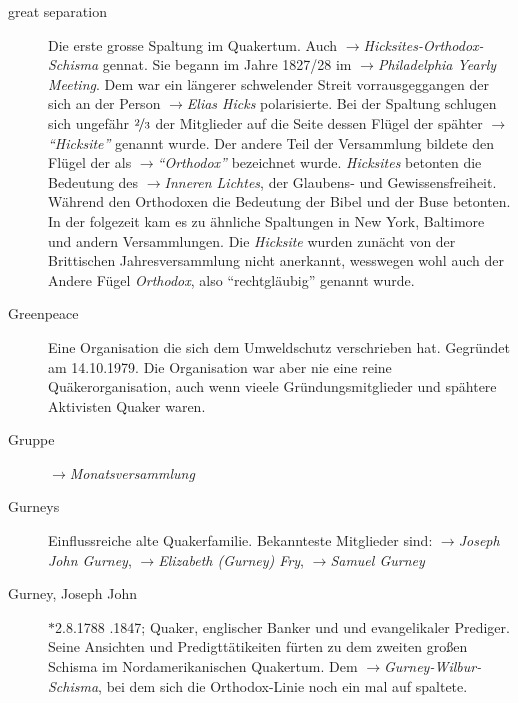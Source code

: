 \begin{description}
 \item[great separation] Die erste grosse Spaltung im Quakertum. Auch
 $\to$\textit{Hicksites-Orthodox-Schisma} gennat. Sie begann im
 Jahre 1827/28 im $\to$\textit{Philadelphia Yearly Meeting}. Dem war ein
 längerer schwelender Streit vorrausgeggangen der sich an der Person
 $\to$\textit{Elias Hicks} polarisierte. Bei der Spaltung schlugen sich
 ungefähr $\nicefrac{2}{3}$ der Mitglieder auf die Seite dessen Flügel der
 spähter $\to$\textit{"`Hicksite"'} genannt wurde. Der andere Teil der
 Versammlung bildete den Flügel der als $\to$\textit{"`Orthodox"'} bezeichnet
 wurde. \textit{Hicksites} betonten die Bedeutung des $\to$\textit{Inneren
 Lichtes}, der Glaubens- und Gewissensfreiheit. Während den Orthodoxen die
 Bedeutung der Bibel und der Buse betonten. In der folgezeit kam es zu
 ähnliche Spaltungen in New York, Baltimore und andern Versammlungen.
 Die \textit{Hicksite} wurden zunächt von der Brittischen Jahresversammlung
 nicht anerkannt, wesswegen wohl auch der Andere Fügel \textit{Orthodox},
 also "`rechtgläubig"' genannt wurde. 

 \item[Greenpeace] Eine Organisation die sich dem Umweldschutz verschrieben hat.
 Gegründet am 14.10.1979. Die Organisation war aber nie eine reine
 Quäkerorganisation, auch wenn vieele Gründungsmitglieder und spähtere Aktivisten
 Quaker waren.

\item[Gruppe] $\to$\textit{Monatsversammlung}

\item[Gurneys] Einflussreiche alte Quakerfamilie. Bekannteste Mitglieder sind:
$\to$\textit{Joseph John Gurney}, $\to$\textit{Elizabeth (Gurney) Fry},
$\to$\textit{Samuel Gurney}


\item[Gurney, Joseph John] $\ast$2.8.1788 .1847; Quaker, englischer Banker und
und evangelikaler Prediger. Seine Ansichten und Predigttätikeiten fürten zu
dem zweiten großen Schisma im Nordamerikanischen Quakertum. Dem
$\to$\textit{Gurney-Wilbur-Schisma}, bei dem sich die Orthodox-Linie noch ein
mal auf spaltete.


\end{description}
